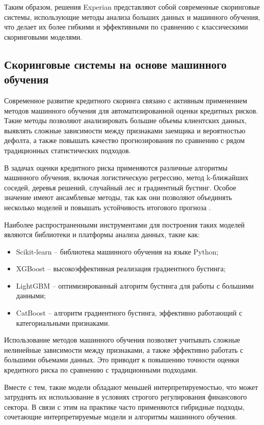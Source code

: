 Таким образом, решения Experian представляют собой современные скоринговые системы, использующие методы анализа больших данных и машинного обучения, что делает их более гибкими и эффективными по сравнению с классическими скоринговыми моделями.

\subsection{Скоринговые системы на основе машинного обучения}

Современное развитие кредитного скоринга связано с активным применением методов машинного обучения для автоматизированной оценки кредитных рисков. Такие методы позволяют анализировать большие объемы клиентских данных, выявлять сложные зависимости между признаками заемщика и вероятностью дефолта, а также повышать качество прогнозирования по сравнению с рядом традиционных статистических подходов.

В задачах оценки кредитного риска применяются различные алгоритмы машинного обучения, включая логистическую регрессию, метод k-ближайших соседей, деревья решений, случайный лес и градиентный бустинг. Особое значение имеют ансамблевые методы, так как они позволяют объединять несколько моделей и повышать устойчивость итогового прогноза \cite{ChubCreditRiskML}.

Наиболее распространенными инструментами для построения таких моделей являются библиотеки и платформы анализа данных, такие как:

\begin{itemize}
  \item Scikit-learn -- библиотека машинного обучения на языке Python;
  \item XGBoost -- высокоэффективная реализация градиентного бустинга;
  \item LightGBM -- оптимизированный алгоритм бустинга для работы с большими данными;
  \item CatBoost -- алгоритм градиентного бустинга, эффективно работающий с категориальными признаками.
\end{itemize}

Использование методов машинного обучения позволяет учитывать сложные нелинейные зависимости между признаками, а также эффективно работать с большими объемами данных. Это приводит к повышению точности оценки кредитного риска по сравнению с традиционными подходами.

Вместе с тем, такие модели обладают меньшей интерпретируемостью, что может затруднять их использование в условиях строгого регулирования финансового сектора. В связи с этим на практике часто применяются гибридные подходы, сочетающие интерпретируемые модели и алгоритмы машинного обучения.

